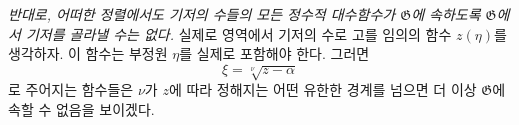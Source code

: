 
\emph{반대로, 어떠한 정렬에서도 기저의 수들의 모든 정수적 대수함수가 $\mathfrak G$에 속하도록 $\mathfrak G$에서 기저를 골라낼 수는 없다.} 실제로 영역에서 기저의 수로 고를 임의의 함수 $z(\eta)$를 생각하자. 이 함수는 부정원 $\eta$를 실제로 포함해야 한다. 그러면
\[
 \xi=\sqrt[\nu]{z-\alpha}
\]
로 주어지는 함수들은 $\nu$가 $z$에 따라 정해지는 어떤 유한한 경계를 넘으면 더 이상 $\mathfrak G$에 속할 수 없음을 보이겠다.
